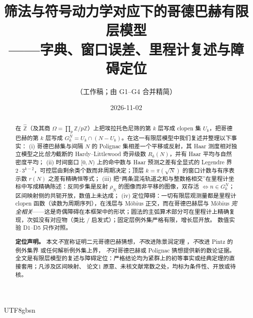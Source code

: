 \documentclass[11pt,a4paper]{article}
\newcommand{\Zhat}{\widehat{\mathbb Z}}
\newcommand{\Om}{\Omega}               %
\theoremstyle{plain}
\theoremstyle{definition}
\begin{document}
\begin{CJK}{UTF8}{gbsn}

\title{筛法与符号动力学对应下的哥德巴赫有限层模型\\[2pt]
\large ——{}字典、窗口误差、里程计复述与障碍定位}
\author{（工作稿；由 G1--G4 合并精简）}
\date{2026-11-02}
\maketitle

\begin{abstract}
在 $\Zhat$（及其商 $\Om=\prod_p\mathbb Z/p\mathbb Z$）上把埃拉托色尼筛的第 $k$ 层写成 clopen 集 $U_k$，把哥德巴赫的第 $k$ 层写成
$G_k^N=U_k\cap(N-U_k)$。在这一有限层模型中我们复述并整理以下事实：
(i) 哥德巴赫集与间隔 $N$ 的 Polignac 集相差一个平移或反射，其 Haar 测度相对独立模型之比\emph{恰为}截断的 Hardy--Littlewood 奇异级数 $R_k(N)$，并有 Haar 平均与自然密度平均；
(ii) 时间窗口 $[0,N)$ 上的命中数与 Haar 预测之差有全显式的 Legendre 界 $2\cdot3^{k-2}$，可控层由剩余类个数而非周期决定；顶层 $k=\pi(\sqrt N)$ 的窗口计数与有序表示数 $r(N)$ 之差有精确恒等式；
(iii) 把“两条混沌轨道之和与整数格相交”在里程计坐标中写成精确陈述：反同步集是反射 $\rho_N$ 的图像而非平移的图像，双存活 $\iff n\in G_k^N$；区间映射侧的共轭开放，数值上未达成；
(iv) 定位障碍：一切有限层观测量都是里程计 clopen 函数（读数为周期序列），在浅层与 M\"obius 正交，而在哥德巴赫层与 M\"obius \emph{完全相关}——这是奇偶障碍在本框架中的形状；圆法的主弧算术部分可在里程计上精确复现，次弧没有对应物（类比 / 启发式）；固定层例外集严格有限，增长层开放。
数值实验 D1--D5 只作对照。

\textbf{定位声明。} 本文\emph{不}宣称证明二元哥德巴赫猜想，\emph{不}改进陈景润定理 \cite{Chen73}，\emph{不}改进 Pintz 的例外集界 \cite{Pin18} 或任何解析例外集上界，
\emph{不}对哥德巴赫或 Polignac 猜想提供新的数论证据。全文是有限层模型的复述与障碍定位：严格结论均为紧群上的初等事实或经典定理的直接套用；凡涉及区间映射、
论文1 \cite{Wang26} 原意、未核文献常数之处，均标为条件性、开放或待核。
\end{abstract}


\end{CJK}
\end{document}
